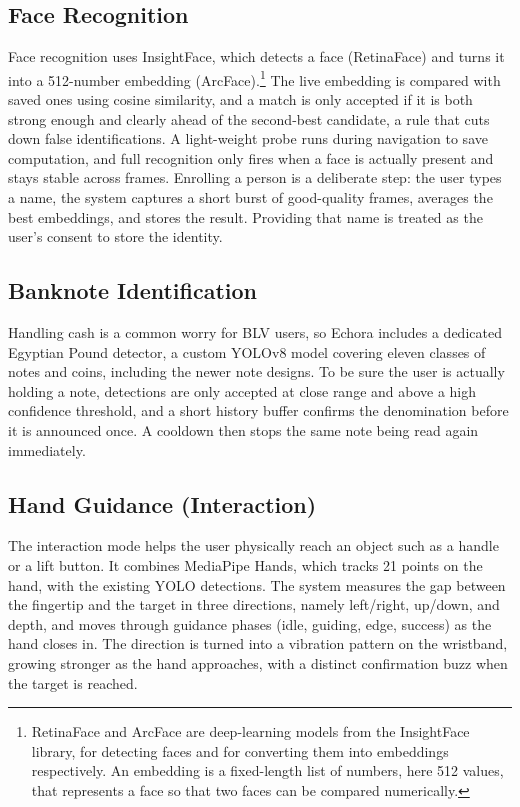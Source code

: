 \subsection{Face Recognition}
Face recognition uses InsightFace, which detects a face (RetinaFace) and turns it into a 512-number embedding (ArcFace).\footnote{RetinaFace and ArcFace are deep-learning models from the InsightFace library, for detecting faces and for converting them into embeddings respectively. An embedding is a fixed-length list of numbers, here 512 values, that represents a face so that two faces can be compared numerically.} The live embedding is compared with saved ones using cosine similarity, and a match is only accepted if it is both strong enough and clearly ahead of the second-best candidate, a rule that cuts down false identifications. A light-weight probe runs during navigation to save computation, and full recognition only fires when a face is actually present and stays stable across frames. Enrolling a person is a deliberate step: the user types a name, the system captures a short burst of good-quality frames, averages the best embeddings, and stores the result. Providing that name is treated as the user's consent to store the identity.

\subsection{Banknote Identification}
Handling cash is a common worry for BLV users, so Echora includes a dedicated Egyptian Pound detector, a custom YOLOv8 model covering eleven classes of notes and coins, including the newer note designs. To be sure the user is actually holding a note, detections are only accepted at close range and above a high confidence threshold, and a short history buffer confirms the denomination before it is announced once. A cooldown then stops the same note being read again immediately.

\subsection{Hand Guidance (Interaction)}
The interaction mode helps the user physically reach an object such as a handle or a lift button. It combines MediaPipe Hands, which tracks 21 points on the hand, with the existing YOLO detections. The system measures the gap between the fingertip and the target in three directions, namely left/right, up/down, and depth, and moves through guidance phases (idle, guiding, edge, success) as the hand closes in. The direction is turned into a vibration pattern on the wristband, growing stronger as the hand approaches, with a distinct confirmation buzz when the target is reached.

